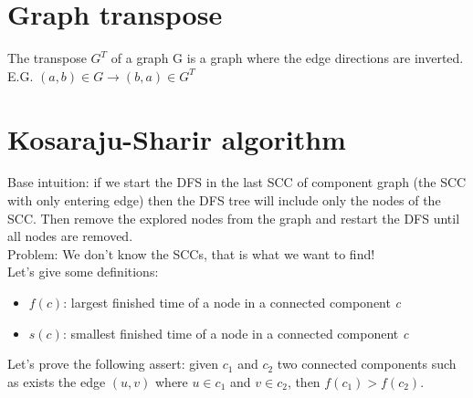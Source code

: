 \documentclass[10pt,a4paper]{book}
\begin{document}
			\section{Graph transpose}
			The transpose $ G^T $ of a graph G is a graph where the edge directions are inverted. E.G. $ (a,b) \in G \rightarrow (b,a) \in G^T $
			\section{Kosaraju-Sharir algorithm}
			Base intuition: if we start the DFS in the last SCC of component graph (the SCC with only entering edge) then the DFS tree will include only the nodes of the SCC. Then remove the explored nodes from the graph and restart the DFS until all nodes are removed.\\
			Problem: We don't know the SCCs, that is what we want to find!\\
			Let's give some definitions:
			\begin{itemize}
				\item \textit{$ f(c) $}: largest finished time of a node in a connected component \textit{c}
				\item \textit{$ s(c) $}: smallest finished time of a node in a connected component \textit{c}
			\end{itemize}
			Let's prove the following assert: given $ c_1 $ and $ c_2 $ two connected components such as exists the edge $ (u,v) $ where $ u \in c_1 $ and $ v \in c_2 $, then $ f(c_1) > f(c_2) $.
\end{document}

